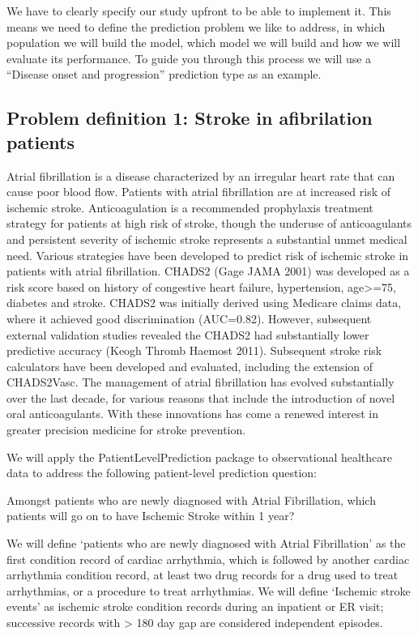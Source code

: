 \documentclass[
]{article}
\begin{document}
We have to clearly specify our study upfront to be able to implement it.
This means we need to define the prediction problem we like to address,
in which population we will build the model, which model we will build
and how we will evaluate its performance. To guide you through this
process we will use a ``Disease onset and progression'' prediction type
as an example.

\hypertarget{problem-definition-1-stroke-in-afibrilation-patients}{%
\subsection{Problem definition 1: Stroke in afibrilation
patients}\label{problem-definition-1-stroke-in-afibrilation-patients}}

Atrial fibrillation is a disease characterized by an irregular heart
rate that can cause poor blood flow. Patients with atrial fibrillation
are at increased risk of ischemic stroke. Anticoagulation is a
recommended prophylaxis treatment strategy for patients at high risk of
stroke, though the underuse of anticoagulants and persistent severity of
ischemic stroke represents a substantial unmet medical need. Various
strategies have been developed to predict risk of ischemic stroke in
patients with atrial fibrillation. CHADS2 (Gage JAMA 2001) was developed
as a risk score based on history of congestive heart failure,
hypertension, age\textgreater=75, diabetes and stroke. CHADS2 was
initially derived using Medicare claims data, where it achieved good
discrimination (AUC=0.82). However, subsequent external validation
studies revealed the CHADS2 had substantially lower predictive accuracy
(Keogh Thromb Haemost 2011). Subsequent stroke risk calculators have
been developed and evaluated, including the extension of CHADS2Vasc. The
management of atrial fibrillation has evolved substantially over the
last decade, for various reasons that include the introduction of novel
oral anticoagulants. With these innovations has come a renewed interest
in greater precision medicine for stroke prevention.

We will apply the PatientLevelPrediction package to observational
healthcare data to address the following patient-level prediction
question:

Amongst patients who are newly diagnosed with Atrial Fibrillation, which
patients will go on to have Ischemic Stroke within 1 year?

We will define `patients who are newly diagnosed with Atrial
Fibrillation' as the first condition record of cardiac arrhythmia, which
is followed by another cardiac arrhythmia condition record, at least two
drug records for a drug used to treat arrhythmias, or a procedure to
treat arrhythmias. We will define `Ischemic stroke events' as ischemic
stroke condition records during an inpatient or ER visit; successive
records with \textgreater{} 180 day gap are considered independent
episodes.
\end{document}
